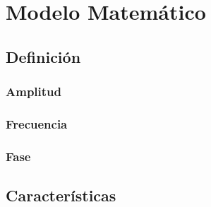 \chapter{Modelo Matemático}%
\section{Definición}%

\subsection{Amplitud}

\subsection{Frecuencia}

\subsection{Fase}

\section{Características}

